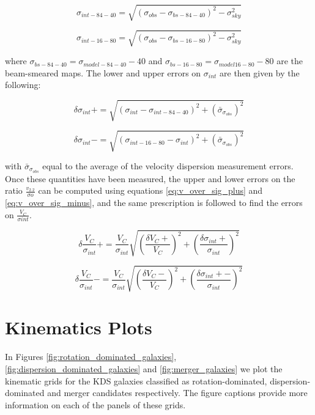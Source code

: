 \documentclass[fleqn,usenatbib]{mnras}
\begin{document}
\begin{equation}\label{eq:sig_84_40}
   \sigma_{int-84-40} = \sqrt{(\sigma_{obs} - \sigma_{bs-84-40})^{2} - \sigma_{sky}^{2}}
\end{equation}

\begin{equation}\label{eq:sig_16_80}
   \sigma_{int-16-80} = \sqrt{\left(\sigma_{obs} - \sigma_{bs-16-80}\right)^{2} - \sigma_{sky}^{2}}
\end{equation}

\noindent
where $\sigma_{bs-84-40} = \sigma_{model-84-40} - 40$ and $\sigma_{bs-16-80} = \sigma_{model16-80} - 80$ are the beam-smeared maps.
The lower and upper errors on $\sigma_{int}$ are then given by the following:

\begin{equation}\label{eq:sig_plus_error}
   \delta\sigma_{int}+ = \sqrt{\left(\sigma_{int} - \sigma_{int-84-40}\right)^{2} + \left(\bar{\sigma}_{\sigma_{obs}}\right)^{2}}
\end{equation}

\begin{equation}\label{eq:sig_minus_error}
   \delta\sigma_{int}- = \sqrt{\left(\sigma_{int-16-80} - \sigma_{int}\right)^{2} + \left(\bar{\sigma}_{\sigma_{obs}}\right)^{2}}
\end{equation}

\noindent
with $\bar{\sigma}_{\sigma_{obs}}$ equal to the average of the velocity dispersion measurement errors.
Once these quantities have been measured, the upper and lower errors on the ratio $\frac{v_{2.2}}{\sigma{o}}$ can be computed using equations \ref{eq:v_over_sig_plus} and \ref{eq:v_over_sig_minus}, and the same prescription is followed to find the errors on $\frac{V_{C}}{\sigma{int}}$.

\begin{equation}\label{eq:v_over_sig_plus}
   \delta\frac{V_{C}}{\sigma_{int}}+ = \frac{V_{C}}{\sigma_{int}}\sqrt{\left(\frac{\delta V_{C}+}{V_{C}}\right)^{2} + \left(\frac{\delta\sigma_{int}+}{\sigma_{int}}\right)^{2}}
\end{equation}

\begin{equation}\label{eq:v_over_sig_minus}
   \delta\frac{V_{C}}{\sigma_{int}}- = \frac{V_{C}}{\sigma_{int}}\sqrt{\left(\frac{\delta V_{C}-}{V_{C}}\right)^{2} + \left(\frac{\delta\sigma_{int}+-}{\sigma_{int}}\right)^{2}}
\end{equation}

\section{Kinematics Plots}\label{app:kinematics_plots}
In Figures \ref{fig:rotation_dominated_galaxies}, \ref{fig:dispersion_dominated_galaxies} and \ref{fig:merger_galaxies} we plot the kinematic grids for the KDS galaxies classified as rotation-dominated, dispersion-dominated and merger candidates respectively.
The figure captions provide more information on each of the panels of these grids.
\end{document}
